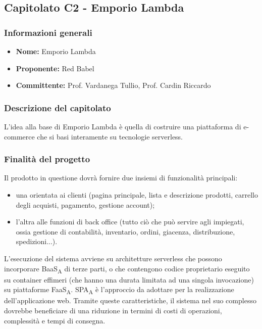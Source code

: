 \subsection{Capitolato C2 - Emporio Lambda}


\subsubsection{Informazioni generali}

\begin{itemize}
	\item{\textbf{Nome:}} Emporio Lambda
	\item{\textbf{Proponente:}} Red Babel
	\item{\textbf{Committente:}} Prof. Vardanega Tullio, Prof. Cardin Riccardo
\end{itemize}



\subsubsection{Descrizione del capitolato}

L'idea alla base di Emporio Lambda è quella di costruire una piattaforma di e-commerce che si basi interamente su tecnologie serverless.


\subsubsection{Finalità del progetto}

Il prodotto in questione dovrà fornire due insiemi di funzionalità principali:
\begin{itemize}
	\item una orientata ai clienti (pagina principale, lista e descrizione prodotti, carrello degli acquisti, pagamento, gestione account);
	\item l'altra alle funzioni di back office (tutto ciò che può servire agli impiegati, ossia gestione di contabilità, inventario, ordini, giacenza, distribuzione, spedizioni...).
\end{itemize}

L'esecuzione del sistema avviene su architetture serverless che possono incorporare BaaS\textsubscript{A} di terze parti, o che contengono codice proprietario eseguito su container effimeri (che hanno una durata limitata ad una singola invocazione) su piattaforme FaaS\textsubscript{A}. SPA\textsubscript{A} è l'approccio da adottare per la realizzazione dell'applicazione web. Tramite queste caratteristiche, il sistema nel suo complesso dovrebbe beneficiare di una riduzione in termini di costi di operazioni, complessità e tempi di consegna.


